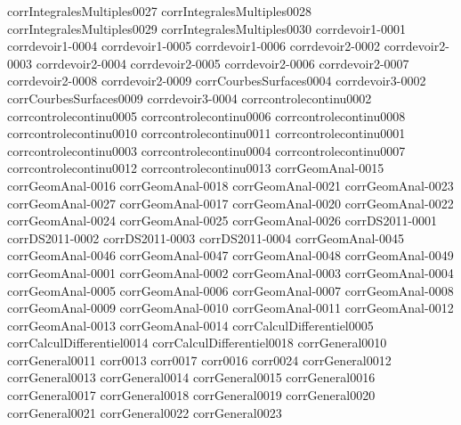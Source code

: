 {corrIntegralesMultiples0027}
{corrIntegralesMultiples0028}
{corrIntegralesMultiples0029}
{corrIntegralesMultiples0030}
{corrdevoir1-0001}
{corrdevoir1-0004}
{corrdevoir1-0005}
{corrdevoir1-0006}
{corrdevoir2-0002}
{corrdevoir2-0003}
{corrdevoir2-0004}
{corrdevoir2-0005}
{corrdevoir2-0006}
{corrdevoir2-0007}
{corrdevoir2-0008}
{corrdevoir2-0009}
{corrCourbesSurfaces0004}
{corrdevoir3-0002}
{corrCourbesSurfaces0009}
{corrdevoir3-0004}
{corrcontrolecontinu0002}
{corrcontrolecontinu0005}
{corrcontrolecontinu0006}
{corrcontrolecontinu0008}
{corrcontrolecontinu0010}
{corrcontrolecontinu0011}
{corrcontrolecontinu0001}
{corrcontrolecontinu0003}
{corrcontrolecontinu0004}
{corrcontrolecontinu0007}
{corrcontrolecontinu0012}
{corrcontrolecontinu0013}
{corrGeomAnal-0015}
{corrGeomAnal-0016}
{corrGeomAnal-0018}
{corrGeomAnal-0021}
{corrGeomAnal-0023}
{corrGeomAnal-0027}
{corrGeomAnal-0017}
{corrGeomAnal-0020}
{corrGeomAnal-0022}
{corrGeomAnal-0024}
{corrGeomAnal-0025}
{corrGeomAnal-0026}
{corrDS2011-0001}
{corrDS2011-0002}
{corrDS2011-0003}
{corrDS2011-0004}
{corrGeomAnal-0045}
{corrGeomAnal-0046}
{corrGeomAnal-0047}
{corrGeomAnal-0048}
{corrGeomAnal-0049}
{corrGeomAnal-0001}
{corrGeomAnal-0002}
{corrGeomAnal-0003}
{corrGeomAnal-0004}
{corrGeomAnal-0005}
{corrGeomAnal-0006}
{corrGeomAnal-0007}
{corrGeomAnal-0008}
{corrGeomAnal-0009}
{corrGeomAnal-0010}
{corrGeomAnal-0011}
{corrGeomAnal-0012}
{corrGeomAnal-0013}
{corrGeomAnal-0014}
{corrCalculDifferentiel0005}
{corrCalculDifferentiel0014}
{corrCalculDifferentiel0018}
{corrGeneral0010}
{corrGeneral0011}
{corr0013}
{corr0017}
{corr0016}
{corr0024}
{corrGeneral0012}
{corrGeneral0013}
{corrGeneral0014}
{corrGeneral0015}
{corrGeneral0016}
{corrGeneral0017}
{corrGeneral0018}
{corrGeneral0019}
{corrGeneral0020}
{corrGeneral0021}
{corrGeneral0022}
{corrGeneral0023}
